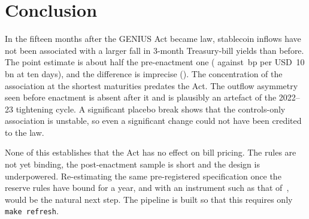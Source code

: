 \section{Conclusion}\label{sec:conclusion}

In the fifteen months after the GENIUS Act became law, stablecoin inflows have not been associated with a larger fall in 3-month Treasury-bill yields than before. The point estimate is about half the pre-enactment one (\bPost{} against \bPre{}\,bp per USD~10\,bn at ten days), and the difference is imprecise (\bDiffP{}). The concentration of the association at the shortest maturities predates the Act. The outflow asymmetry seen before enactment is absent after it and is plausibly an artefact of the 2022--23 tightening cycle. A significant placebo break shows that the controls-only association is unstable, so even a significant change could not have been credited to the law.

None of this establishes that the Act has no effect on bill pricing. The rules are not yet binding, the post-enactment sample is short and the design is underpowered. Re-estimating the same pre-registered specification once the reserve rules have bound for a year, and with an instrument such as that of~\cite{ahmed2025}, would be the natural next step. The pipeline is built so that this requires only \texttt{make refresh}.

